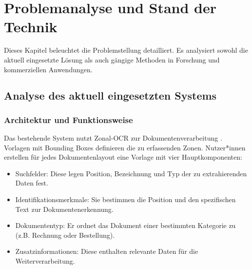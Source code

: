 \chapter{Problemanalyse und Stand der Technik}
\label{cha:problemanalyse-stand-der-technik}

Dieses Kapitel beleuchtet die Problemstellung detailliert. Es analysiert sowohl die aktuell eingesetzte Lösung als auch gängige Methoden in Forschung und kommerziellen Anwendungen.

\section{Analyse des aktuell eingesetzten Systems}
\label{sec:analyse-des-akutell-eingesetzten-systems}

\subsection{Architektur und Funktionsweise}
\label{subsec:architektur-und-funktionsweise}

Das bestehende System nutzt Zonal-\gls{OCR} zur Dokumentenverarbeitung \parencite{multidata_help}. 
Vorlagen mit Bounding Boxes definieren die zu erfassenden Zonen. 
Nutzer*innen erstellen für jedes Dokumentenlayout eine Vorlage mit vier Hauptkomponenten:

\begin{itemize}
	\item Suchfelder: Diese legen Position, Bezeichnung und Typ der zu extrahierenden Daten fest.
	\item Identifikationsmerkmale: Sie bestimmen die Position und den spezifischen Text zur Dokumentenerkennung.
	\item Dokumententyp: Er ordnet das Dokument einer bestimmten Kategorie zu (z.B. Rechnung oder Bestellung).
	\item Zusatzinformationen: Diese enthalten relevante Daten für die Weiterverarbeitung.
\end{itemize}

